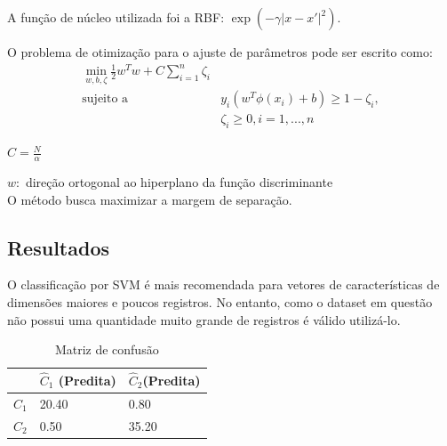 \documentclass[11pt,a4paper]{article}
\numberwithin{equation}{section}
\begin{document}
A função de núcleo utilizada foi a RBF: $\exp(-\gamma |x-x'|^2)$.

O problema de otimização para o ajuste de parâmetros pode ser escrito como:
\begin{align*}
\min_ {w, b, \zeta} \frac{1}{2} w^T w + C \sum_{i=1}^{n} \zeta_i \\
\textrm {sujeito a } & y_i (w^T \phi (x_i) + b) \geq 1 - \zeta_i,\\
& \zeta_i \geq 0, i=1, ..., n
\end{align*}

$C = \frac{N}{\alpha}$

$w:$ direção ortogonal ao hiperplano da função discriminante
\\
O método busca maximizar a margem de separação.

\subsection{Resultados}
O classificação por SVM é mais recomendada para vetores de características de dimensões maiores e poucos registros. No entanto, como o dataset em questão não possui uma quantidade muito grande de registros é válido utilizá-lo.

\begin{table}[H]
\centering
\caption{Matriz de confusão}
\begin{tabular}{l l l}
\hline
 & \textbf{$\hat{C}_1$ (Predita)} & \textbf{$\hat{C}_2$(Predita)}\\
\hline
$C_1$ & 20.40 & 0.80 \\
$C_2$ & 0.50  & 35.20\\ 
\hline
\end{tabular}
\end{table}
\end{document}
